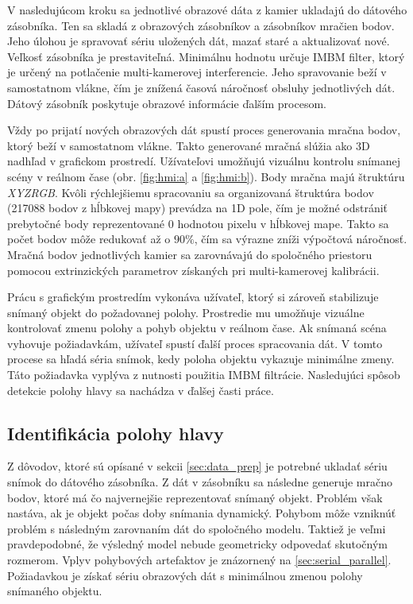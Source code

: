 V nasledujúcom kroku sa jednotlivé obrazové dáta z kamier ukladajú do dátového zásobníka. Ten sa skladá z obrazových zásobníkov a zásobníkov mračien bodov. Jeho úlohou je spravovať sériu uložených dát, mazať staré a aktualizovať nové. Veľkosť zásobníka je prestaviteľná. Minimálnu hodnotu určuje IMBM filter, ktorý je určený na potlačenie multi-kamerovej interferencie. Jeho spravovanie beží v samostatnom vlákne, čím je znížená časová náročnosť obsluhy jednotlivých dát. Dátový zásobník poskytuje obrazové informácie ďalším procesom. 

Vždy po prijatí nových obrazových dát spustí proces generovania mračna bodov, ktorý beží v samostatnom vlákne. Takto generované mračná slúžia ako 3D nadhľad v grafickom prostredí. Užívateľovi umožňujú vizuálnu kontrolu snímanej scény v reálnom čase (obr. \ref{fig:hmi:a} a \ref{fig:hmi:b}). Body mračna majú štruktúru \textit{XYZRGB}. Kvôli rýchlejšiemu spracovaniu sa organizovaná štruktúra bodov (217088 bodov z hĺbkovej mapy) prevádza na 1D pole, čím je možné odstrániť prebytočné body reprezentované 0 hodnotou pixelu v hĺbkovej mape. Takto sa počet bodov môže redukovať až o $90\%$, čím sa výrazne zníži výpočtová náročnosť. Mračná bodov jednotlivých kamier sa zarovnávajú do spoločného priestoru pomocou extrinzických parametrov získaných pri multi-kamerovej kalibrácii. 

Prácu s grafickým prostredím vykonáva užívateľ, ktorý si zároveň stabilizuje snímaný objekt do požadovanej polohy. Prostredie mu umožňuje vizuálne kontrolovať zmenu polohy a pohyb objektu v reálnom čase. Ak snímaná scéna vyhovuje požiadavkám, užívateľ spustí ďalší proces spracovania dát. V tomto procese sa hľadá séria snímok, kedy poloha objektu vykazuje minimálne zmeny. Táto požiadavka vyplýva z nutnosti použitia IMBM filtrácie. Nasledujúci spôsob detekcie polohy hlavy sa nachádza v ďalšej časti práce. 


\subsection{Identifikácia polohy hlavy}

Z dôvodov, ktoré sú opísané v sekcii \ref{sec:data_prep} je potrebné ukladať sériu snímok do dátového zásobníka. Z dát v zásobníku sa následne generuje mračno bodov, ktoré má čo najvernejšie reprezentovať snímaný objekt. Problém však nastáva, ak je objekt počas doby snímania dynamický. Pohybom môže vzniknúť problém s následným zarovnaním dát do spoločného modelu. Taktiež je veľmi pravdepodobné, že výsledný model nebude geometricky odpovedať skutočným rozmerom. Vplyv pohybových artefaktov je znázornený na \ref{sec:serial_parallel}. Požiadavkou je získať sériu obrazových dát s minimálnou zmenou polohy snímaného objektu. \newline 

